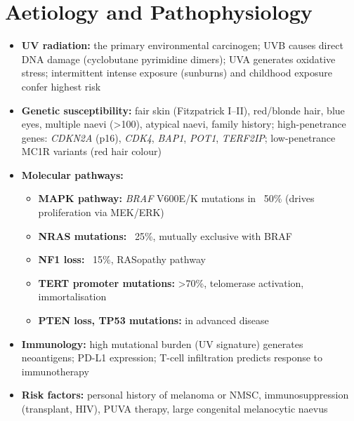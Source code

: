 \section*{Aetiology and Pathophysiology}
\begin{itemize}
    \item \textbf{UV radiation:} the primary environmental carcinogen; UVB causes direct DNA damage (cyclobutane pyrimidine dimers); UVA generates oxidative stress; intermittent intense exposure (sunburns) and childhood exposure confer highest risk
    \item \textbf{Genetic susceptibility:} fair skin (Fitzpatrick I--II), red/blonde hair, blue eyes, multiple naevi (>100), atypical naevi, family history; high-penetrance genes: \textit{CDKN2A} (p16), \textit{CDK4}, \textit{BAP1}, \textit{POT1}, \textit{TERF2IP}; low-penetrance MC1R variants (red hair colour)
    \item \textbf{Molecular pathways:}
    \begin{itemize}
        \item \textbf{MAPK pathway:} \textit{BRAF} V600E/K mutations in ~50\% (drives proliferation via MEK/ERK)
        \item \textbf{NRAS mutations:} ~25\%, mutually exclusive with BRAF
        \item \textbf{NF1 loss:} ~15\%, RASopathy pathway
        \item \textbf{TERT promoter mutations:} >70\%, telomerase activation, immortalisation
        \item \textbf{PTEN loss, TP53 mutations:} in advanced disease
    \end{itemize}
    \item \textbf{Immunology:} high mutational burden (UV signature) generates neoantigens; PD-L1 expression; T-cell infiltration predicts response to immunotherapy
    \item \textbf{Risk factors:} personal history of melanoma or NMSC, immunosuppression (transplant, HIV), PUVA therapy, large congenital melanocytic naevus
\end{itemize}


